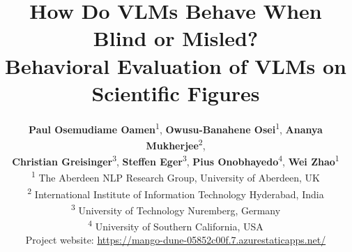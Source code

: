 \documentclass[11pt]{article}
\title{How Do VLMs Behave When Blind or Misled? \\
Behavioral Evaluation of VLMs on Scientific Figures}
\author{
  \textbf{Paul Osemudiame Oamen}\textsuperscript{1},
  \textbf{Owusu-Banahene Osei}\textsuperscript{1},
  \textbf{Ananya Mukherjee}\textsuperscript{2},\\
  \textbf{Christian Greisinger}\textsuperscript{3},
    \textbf{Steffen Eger}\textsuperscript{3},
  \textbf{Pius Onobhayedo}\textsuperscript{4}, 
  \textbf{Wei Zhao}\textsuperscript{1} \\
  \textsuperscript{1} The Aberdeen NLP Research Group, University of Aberdeen, UK \\
  \textsuperscript{2} International Institute of Information Technology Hyderabad, India \\ \textsuperscript{3} University of Technology Nuremberg, Germany \\ \textsuperscript{4} University of Southern California, USA \\
  Project website: \href{https://mango-dune-05852c00f.7.azurestaticapps.net/}{https://mango-dune-05852c00f.7.azurestaticapps.net/}\\
}
\begin{document}
\maketitle

\begin{abstract}

\end{abstract}























\end{document}
